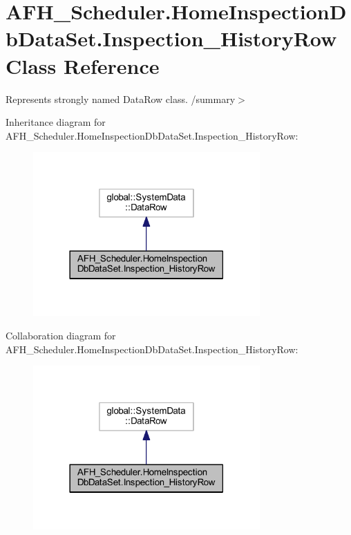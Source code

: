 \section{A\+F\+H\+\_\+\+Scheduler.\+Home\+Inspection\+Db\+Data\+Set.\+Inspection\+\_\+\+History\+Row Class Reference}
\label{class_a_f_h___scheduler_1_1_home_inspection_db_data_set_1_1_inspection___history_row}


Represents strongly named Data\+Row class. /summary$>$  




Inheritance diagram for A\+F\+H\+\_\+\+Scheduler.\+Home\+Inspection\+Db\+Data\+Set.\+Inspection\+\_\+\+History\+Row\+:
\nopagebreak
\begin{figure}[H]
\begin{center}
\leavevmode
\includegraphics[width=246pt]{class_a_f_h___scheduler_1_1_home_inspection_db_data_set_1_1_inspection___history_row__inherit__graph}
\end{center}
\end{figure}


Collaboration diagram for A\+F\+H\+\_\+\+Scheduler.\+Home\+Inspection\+Db\+Data\+Set.\+Inspection\+\_\+\+History\+Row\+:
\nopagebreak
\begin{figure}[H]
\begin{center}
\leavevmode
\includegraphics[width=246pt]{class_a_f_h___scheduler_1_1_home_inspection_db_data_set_1_1_inspection___history_row__coll__graph}
\end{center}
\end{figure}
